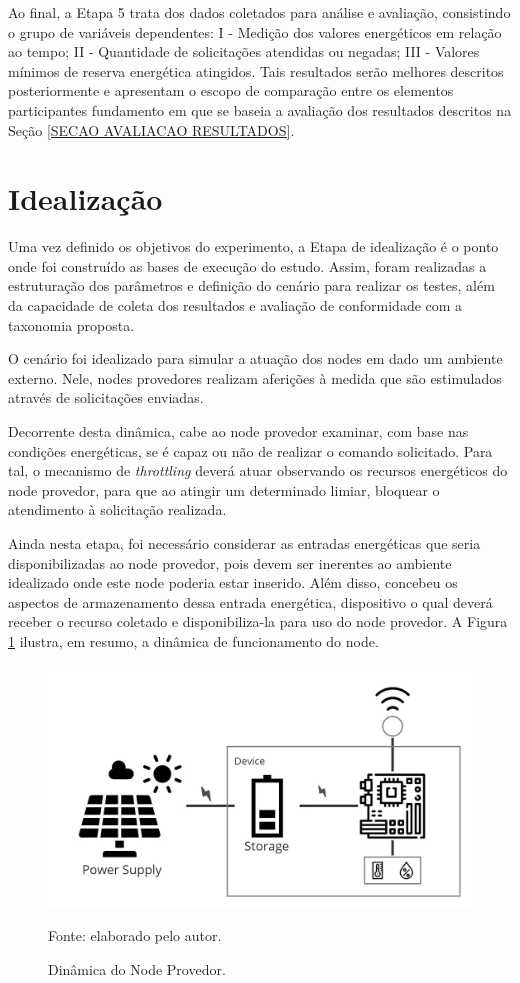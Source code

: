 Ao final, a Etapa 5 trata dos dados coletados para análise e avaliação,
consistindo o grupo de variáveis dependentes: I - Medição dos valores energéticos em relação ao tempo; II - Quantidade de solicitações atendidas ou negadas; III - Valores mínimos de reserva energética atingidos. Tais resultados serão melhores descritos posteriormente e apresentam o escopo de comparação entre os elementos participantes fundamento em que se baseia a avaliação dos resultados descritos na Seção \ref{SECAO AVALIACAO RESULTADOS}.

\section{Idealização}
\label{cap6:idealizacao}
Uma vez definido os objetivos do experimento, a Etapa de idealização é o ponto onde foi construído as bases de execução do estudo. Assim, foram realizadas a estruturação  dos parâmetros e definição do cenário para realizar os testes, além da capacidade de coleta dos resultados e avaliação de conformidade com a taxonomia proposta.

O cenário foi idealizado para simular a atuação dos nodes em dado um ambiente externo. Nele, nodes provedores realizam aferições à medida que são estimulados através de solicitações enviadas. 

Decorrente desta  dinâmica, cabe ao node provedor examinar, com base nas condições energéticas, se é capaz ou não de realizar o comando solicitado. Para tal, o mecanismo de \textit{throttling} deverá atuar observando os recursos energéticos do node provedor, para que ao atingir um determinado limiar, bloquear o atendimento à solicitação realizada.

Ainda nesta etapa, foi necessário considerar as entradas energéticas que seria disponibilizadas ao node provedor, pois devem ser inerentes ao ambiente idealizado onde este node poderia estar inserido. Além disso, concebeu os aspectos de armazenamento dessa entrada energética, dispositivo o qual deverá receber o recurso coletado e disponibiliza-la para uso do node provedor. A Figura \ref{fig:cap6dinamica} ilustra, em resumo, a dinâmica de funcionamento do node.

\begin{figure}[H]
	\centering
	
	\caption{Dinâmica do Node Provedor.}
	\label{fig:cap6dinamica}
	\noindent\includegraphics[width=0.75\linewidth]{Imagens/cap6/cap6dinamica.jpg} 
		
	Fonte: elaborado pelo autor.
\end{figure}


